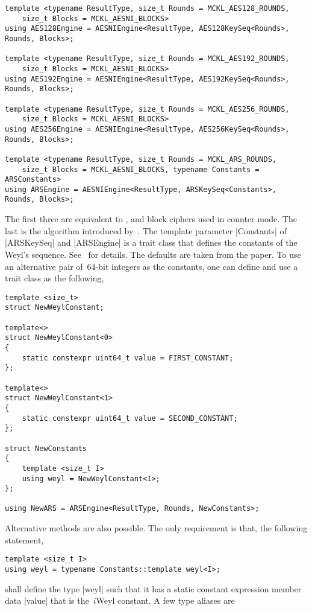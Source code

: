 \begin{verbatim}
template <typename ResultType, size_t Rounds = MCKL_AES128_ROUNDS,
    size_t Blocks = MCKL_AESNI_BLOCKS>
using AES128Engine = AESNIEngine<ResultType, AES128KeySeq<Rounds>, Rounds, Blocks>;

template <typename ResultType, size_t Rounds = MCKL_AES192_ROUNDS,
    size_t Blocks = MCKL_AESNI_BLOCKS>
using AES192Engine = AESNIEngine<ResultType, AES192KeySeq<Rounds>, Rounds, Blocks>;

template <typename ResultType, size_t Rounds = MCKL_AES256_ROUNDS,
    size_t Blocks = MCKL_AESNI_BLOCKS>
using AES256Engine = AESNIEngine<ResultType, AES256KeySeq<Rounds>, Rounds, Blocks>;

template <typename ResultType, size_t Rounds = MCKL_ARS_ROUNDS,
    size_t Blocks = MCKL_AESNI_BLOCKS, typename Constants = ARSConstants>
using ARSEngine = AESNIEngine<ResultType, ARSKeySeq<Constants>, Rounds, Blocks>;
\end{verbatim}
The first three are equivalent to ,  and  block ciphers
used in counter mode. The last is the \ars algorithm introduced
by~\cite{Salmon:2011um}. The template parameter |Constants| of |ARSKeySeq| and
|ARSEngine| is a trait class that defines the constants of the Weyl's sequence.
See~\cite{Salmon:2011um} for details. The defaults are taken from the paper. To
use an alternative pair of~64-bit integers as the constants, one can define and
use a trait class as the following,
\begin{verbatim}
template <size_t>
struct NewWeylConstant;

template<>
struct NewWeylConstant<0>
{
    static constexpr uint64_t value = FIRST_CONSTANT;
};

template<>
struct NewWeylConstant<1>
{
    static constexpr uint64_t value = SECOND_CONSTANT;
};

struct NewConstants
{
    template <size_t I>
    using weyl = NewWeylConstant<I>;
};

using NewARS = ARSEngine<ResultType, Rounds, NewConstants>;
\end{verbatim}
Alternative methods are also possible. The only requirement is that, the
following statement,
\begin{verbatim}
template <size_t I>
using weyl = typename Constants::template weyl<I>;
\end{verbatim}
shall define the type |weyl| such that it has a static constant expression
member data |value| that is the~$i$\ith Weyl constant. A few type aliases are

